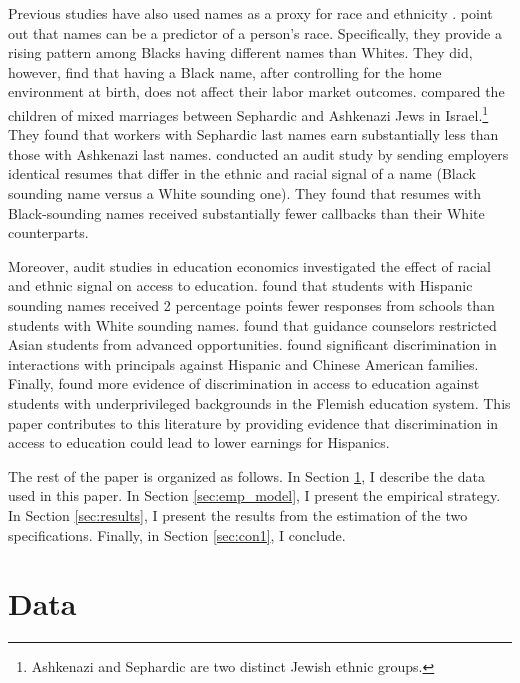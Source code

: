 Previous studies have also used names as a proxy for race and ethnicity \autocite{fryer2004causes, rubinstein2014pride, bertrand2004emily}. \textcite{fryer2004causes} point out that names can be a predictor of a person's race. Specifically, they provide a rising pattern among Blacks having different names than Whites. They did, however, find that having a Black name, after controlling for the home environment at birth, does not affect their labor market outcomes. \textcite{rubinstein2014pride} compared the children of mixed marriages between Sephardic and Ashkenazi Jews in Israel.\footnote{Ashkenazi and Sephardic are two distinct Jewish ethnic groups.} They found that workers with Sephardic last names earn substantially less than those with Ashkenazi last names. \textcite{bertrand2004emily} conducted an audit study by sending employers identical resumes that differ in the ethnic and racial signal of a name (Black sounding name versus a White sounding one). They found that resumes with Black-sounding names received substantially fewer callbacks than their White counterparts. 

Moreover, audit studies in education economics investigated the effect of racial and ethnic signal on access to education. \textcite{bergman2018education} found that students with Hispanic sounding names received 2 percentage points fewer responses from schools than students with White sounding names. \textcite{janssen2022guidance} found that guidance counselors restricted Asian students from advanced opportunities. \textcite{gaddis2024racial} found significant discrimination in interactions with principals against Hispanic and Chinese American families. Finally, \textcite{bourabain2023school} found more evidence of discrimination in access to education against students with underprivileged backgrounds in the Flemish education system. This paper contributes to this literature by providing evidence that discrimination in access to education could lead to lower earnings for Hispanics. 

The rest of the paper is organized as follows. In Section \ref{sec:data}, I describe the data used in this paper. In Section \ref{sec:emp_model}, I present the empirical strategy. In Section \ref{sec:results}, I present the results from the estimation of the two specifications. Finally, in Section \ref{sec:con1}, I conclude.

\section{Data}\label{sec:data}

